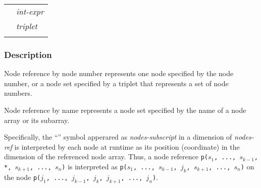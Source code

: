 \hspace{\hsize}

\begin{tabular}{ll}
 \hspace{0.5cm} & {\it int-expr} \\
 \hspace{0.5cm} & {\it triplet} \\
 \hspace{0.5cm} & {\tt *} \\
\end{tabular}


\subsubsection*{Description}

Node reference by node number represents one node specified by the node 
number, or a node set specified by a triplet that represents a set of
node numbers.

Node reference by name represents a node set specified by the name of a
node array or its subarray.


Specifically, the ``{\tt *}'' symbol apperared as {\it nodes-subscript}
in a dimension of {\it nodes-ref} is interpreted by each node at runtime
as its position (coordinate) in the dimension of the referenced node
array.
%
Thus, a node reference {\tt p($s_1$, ..., $s_{k-1}$, *, $s_{k+1}$, ...,
$s_n$)} is interpreted as {\tt p($s_1$, ..., $s_{k-1}$, $j_k$,
$s_{k+1}$, ..., $s_n$)} on the node {\tt p($j_1$, ..., $j_{k-1}$, $j_k$,
$j_{k+1}$, ..., $j_n$)}.


